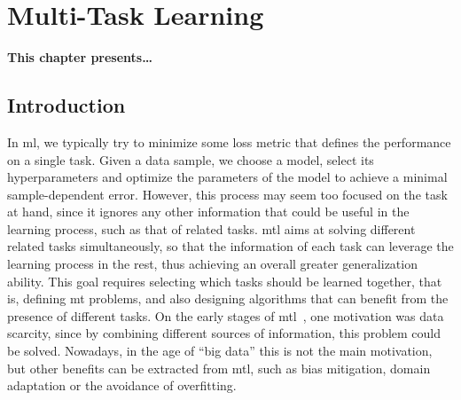 
\chapter{Multi-Task Learning} %
\label{Chapter3}

\glsresetall
{} %

{\bf \small{
This chapter presents\dots
}}

\section{Introduction}



In \acrfull{ml}, we typically try to minimize some loss metric that defines the performance on a single task. Given a data sample, we choose a model, select its hyperparameters and optimize the parameters of the model to achieve a minimal sample-dependent error. However, this process may seem too focused on the task at hand, since it ignores any other information that could be useful in the learning process, such as that of related tasks. 
\acrfull{mtl} aims at solving different related tasks simultaneously, so that the information of each task can leverage the learning process in the rest, thus achieving an overall greater generalization ability.
This goal requires selecting which tasks should be learned together, that is, defining \acrfull{mt} problems, and also designing algorithms that can benefit from the presence of different tasks.
On the early stages of \acrshort{mtl}~\citep{Caruana97,baxter2000model}, one motivation was data scarcity, since by combining different sources of information, this problem could be solved. Nowadays, in the age of ``big data'' this is not the main motivation, but other benefits can be extracted from \acrshort{mtl}, such as bias mitigation, domain adaptation or the avoidance of overfitting. 

